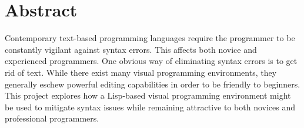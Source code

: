 \chapter*{Abstract}
Contemporary text-based programming languages require the programmer to be
constantly vigilant against syntax errors. This affects both novice and
experienced programmers. One obvious way of eliminating syntax errors is to
get rid of text. While there exist many visual programming environments, they generally
eschew powerful editing capabilities in order to be friendly to beginners.
This project explores how a Lisp-based visual programming environment might be
used to mitigate syntax issues while remaining attractive to both novices and
professional programmers.
